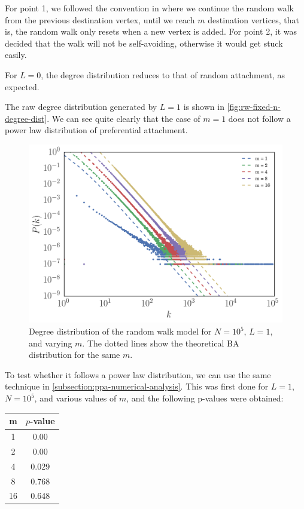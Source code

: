 For point 1, we followed the convention in \citet{Saramaki2004} where we continue the random walk from the previous destination vertex, until we reach $m$ destination vertices, that is, the random walk only resets when a new vertex is added. For point 2, it was decided that the walk will not be self-avoiding, otherwise it would get stuck easily. 

For $L=0$, the degree distribution reduces to that of random attachment, as expected. 

The raw degree distribution generated by $L = 1$ is shown in \autoref{fig:rw-fixed-n-degree-dist}. We can see quite clearly that the case of $m = 1$ does not follow a power law distribution of preferential attachment. 

\begin{figure}
    \centering
    \includegraphics[height=0.5\linewidth]{img/rw-fixed-n-degree-dist}
    \caption{Degree distribution of the random walk model for $N=10^5$, $L=1$, and varying $m$. The dotted lines show the theoretical BA distribution for the same $m$. }
    \label{fig:rw-fixed-n-degree-dist}
\end{figure}

To test whether it follows a power law distribution, we can use the same technique in \autoref{subsection:ppa-numerical-analysis}. This was first done for $L=1$, $N=10^5$, and various values of $m$, and the following p-values were obtained:

\begin{center}
\begin{tabular}{ c | c}
m & $p$-value \\
\hline
1 & 0.00 \\
2 & 0.00 \\
4 & 0.029 \\
8 & 0.768 \\
16 & 0.648 \\
\end{tabular}
\label{table:rw-kstest}
\end{center} 


